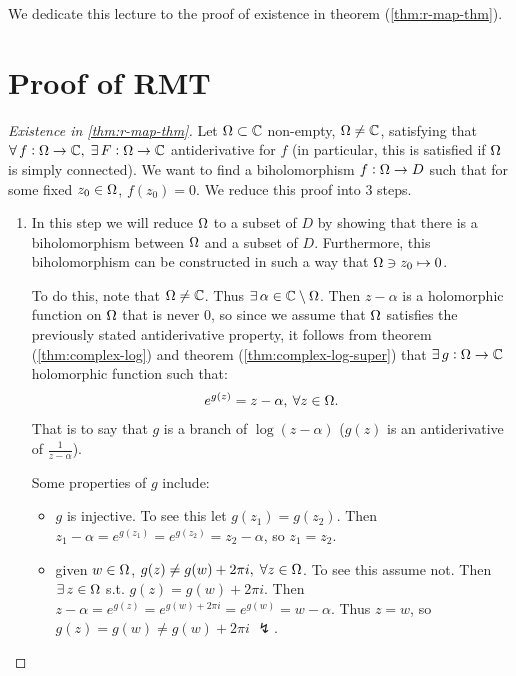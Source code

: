 
\setcounter{section}{0}
\setcounter{theorem}{0}



We dedicate this lecture to the proof of existence in theorem (\ref{thm:r-map-thm}).

\section{Proof of RMT}


\begin{proof}[Existence in \ref{thm:r-map-thm}]
Let $\Omega \subset \mathbb{C}$ non-empty, $\Omega \neq \mathbb{C}$, satisfying that $\forall \, f:\Omega \rightarrow \mathbb{C}, \; \exists \, F: \Omega \to \mathbb{C}$ antiderivative for $f$ (in particular, this is satisfied if $\Omega $ is simply connected). We want to find a biholomorphism $f:\Omega \to D$ such that for some fixed $z_0 \in \Omega$, $f(z_0) = 0$. We reduce this proof into 3 steps.
\begin{enumerate}

\subsection{Step 1}

    \item In this step we will reduce $\Omega$ to a subset of $D$ by showing that there is a biholomorphism between $\Omega$ and a subset of $D$. Furthermore, this biholomorphism can be constructed in such a way that $\Omega \ni z_0 \mapsto 0$. 
    
    To do this, note that $\Omega \neq \mathbb{C}$. Thus $\exists \, \alpha \in \mathbb{C} \setminus \Omega$. Then $z- \alpha$ is a holomorphic function on $\Omega$ that is never $0$, so since we assume that $\Omega$ satisfies the previously stated antiderivative property, it follows from theorem (\ref{thm:complex-log}) and theorem (\ref{thm:complex-log-super}) that $\exists \, g: \Omega \to \mathbb{C}$ holomorphic function such that:
    \begin{align*}
        e^{g(z)} = z - \alpha, \: \forall z \in \Omega.
    \end{align*}
    That is to say that $g$ is a branch of $\log(z-\alpha)$ ($g(z)$ is an antiderivative of $\frac{1}{z-\alpha}$).
    
    Some properties of $g$ include:
    \begin{itemize}
        \item $g$ is injective. To see this let $g(z_1) = g(z_2)$. Then $z_1 - \alpha = e^{g(z_1)} = e^{g(z_2)} = z_2 - \alpha$, so $z_1 = z_2$.
        \item given $w \in \Omega$, $g(z) \neq g(w) + 2 \pi i, \; \forall z \in \Omega$. To see this assume not. Then $\exists \, z \in \Omega$ s.t. $g(z) = g(w) + 2 \pi i$. Then $z - \alpha = e^{g(z)} = e^{g(w) + 2 \pi i}  = e^{g(w) } = w - \alpha$. Thus $z = w$, so $g(z) = g(w) \neq g(w) + 2 \pi i$ $\lightning$.
        

\end{itemize}
\end{enumerate}
\end{proof}
